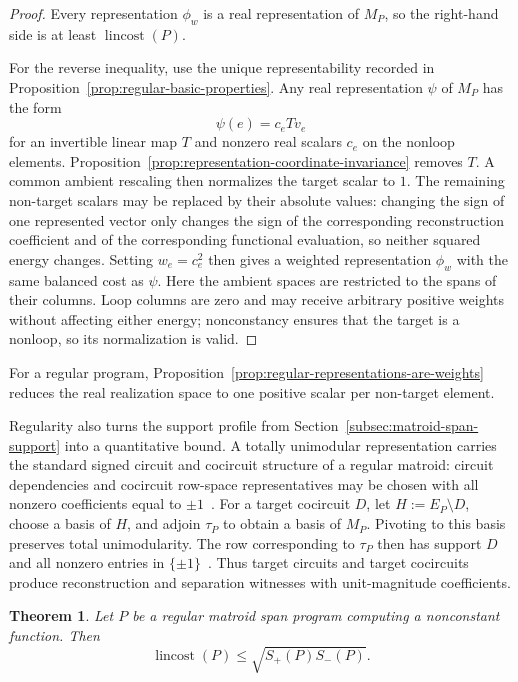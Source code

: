 \documentclass[11pt]{article}
\numberwithin{equation}{section}
\newtheorem{theorem}[definition]{Theorem}
\theoremstyle{remark}
\begin{document}
\begin{proof}
Every representation $\phi_w$ is a real representation of $M_P$, so the
right-hand side is at least $\operatorname{lincost}(P)$.

For the reverse inequality, use the unique representability recorded in
Proposition~\ref{prop:regular-basic-properties}. Any real representation
$\psi$ of $M_P$ has the form
\begin{equation}
    \psi(e)=c_e T v_e
\end{equation}
for an invertible linear map $T$ and nonzero real scalars $c_e$ on the
nonloop elements. Proposition~\ref{prop:representation-coordinate-invariance}
removes $T$. A common ambient rescaling then normalizes the target scalar to
$1$. The remaining non-target scalars may be replaced by their absolute
values: changing the sign of one represented vector only changes the sign of
the corresponding reconstruction coefficient and of the corresponding
functional evaluation, so neither squared energy changes. Setting
$w_e=c_e^2$ then gives a weighted representation $\phi_w$ with the
same balanced cost as $\psi$. Here the ambient spaces are restricted to the
spans of their columns. Loop columns are zero and may receive arbitrary
positive weights without affecting either energy; nonconstancy ensures that
the target is a nonloop, so its normalization is valid.
\end{proof}

For a regular program, Proposition~\ref{prop:regular-representations-are-weights}
reduces the real realization space to one positive scalar per non-target
element.

Regularity also turns the support profile from
Section~\ref{subsec:matroid-span-support} into a quantitative bound. A
totally unimodular representation carries the standard signed circuit and
cocircuit structure of a regular matroid: circuit dependencies and
cocircuit row-space representatives may be chosen with all nonzero
coefficients equal to $\pm1$~\cite{Oxley2011}. For a target cocircuit $D$,
let
$H:=E_P\setminus D$, choose a basis of $H$, and adjoin $\tau_P$ to obtain a
basis of $M_P$. Pivoting to this basis preserves total unimodularity. The row
corresponding to $\tau_P$ then has support $D$ and all nonzero entries in
$\{\pm1\}$~\cite{Oxley2011}. Thus target circuits and target cocircuits
produce reconstruction and separation witnesses with unit-magnitude
coefficients.

\begin{theorem}
\label{thm:regular-support-bound}
Let $P$ be a regular matroid span program computing a nonconstant function.
Then
\begin{equation}
    \operatorname{lincost}(P)
    \leq
    \sqrt{S_+(P)S_-(P)}.
\end{equation}
\end{theorem}
\end{document}
